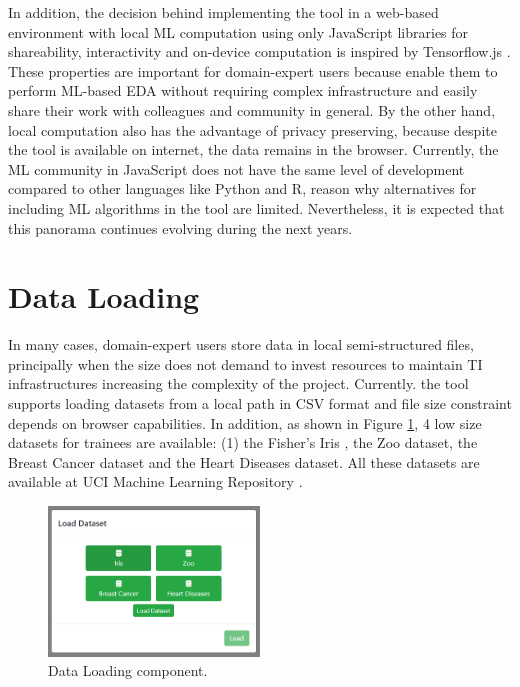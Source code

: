 In addition, the decision behind implementing the tool in a web-based environment with local ML computation using only JavaScript libraries for shareability, interactivity and on-device computation is inspired by Tensorflow.js \cite{Smilkov2019TensorFlow.js:Beyond}. These properties are important for domain-expert users because enable them to perform ML-based EDA without requiring complex infrastructure and easily share their work with colleagues and community in general. By the other hand, local computation also has the advantage of privacy preserving, because despite the tool is available on internet, the data remains in the browser. Currently, the ML community in JavaScript does not have the same level of development compared to other languages like Python and R, reason why alternatives for including ML algorithms in the tool are limited. Nevertheless, it is expected that this panorama continues evolving during the next years.

\section{Data Loading}
\label{section3.1}

In many cases, domain-expert users store data in local semi-structured files, principally when the size does not demand to invest resources to maintain TI infrastructures increasing the complexity of the project.
Currently. the tool supports loading datasets from a local path in CSV format and file size constraint depends on browser capabilities. In addition, as shown in Figure \ref{fig:load-dataset-component}, 4 low size datasets for trainees are available: (1) the Fisher's Iris \cite{FisherIris}, the Zoo dataset, the Breast Cancer dataset and the Heart Diseases dataset. All these datasets are available at UCI Machine Learning Repository \cite{Dua2017UCIRepository}.

\begin{figure}[ht]
 \centering
 \includegraphics[width=0.5\textwidth]{load-dataset.png}
 \caption{Data Loading component.}
 \label{fig:load-dataset-component}
\end{figure}

